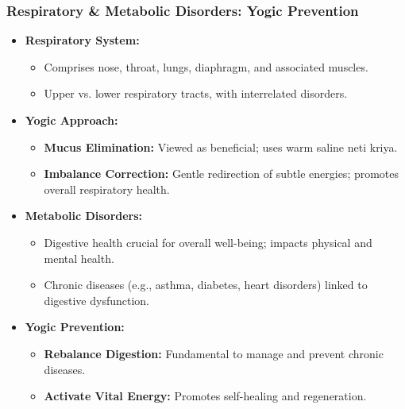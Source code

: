 \begin{frame}[fragile]\frametitle{Respiratory \& Metabolic Disorders: Yogic Prevention}

    \begin{itemize}
        \item \textbf{Respiratory System:}
        \begin{itemize}
            \item Comprises nose, throat, lungs, diaphragm, and associated muscles.
            \item Upper vs. lower respiratory tracts, with interrelated disorders.
        \end{itemize}
        \item \textbf{Yogic Approach:}
        \begin{itemize}
            \item \textbf{Mucus Elimination:} Viewed as beneficial; uses warm saline neti kriya.
            \item \textbf{Imbalance Correction:} Gentle redirection of subtle energies; promotes overall respiratory health.
        \end{itemize}
        \item \textbf{Metabolic Disorders:}
        \begin{itemize}
            \item Digestive health crucial for overall well-being; impacts physical and mental health.
            \item Chronic diseases (e.g., asthma, diabetes, heart disorders) linked to digestive dysfunction.
        \end{itemize}
        \item \textbf{Yogic Prevention:}
        \begin{itemize}
            \item \textbf{Rebalance Digestion:} Fundamental to manage and prevent chronic diseases.
            \item \textbf{Activate Vital Energy:} Promotes self-healing and regeneration.
        \end{itemize}
    \end{itemize}

\end{frame}

